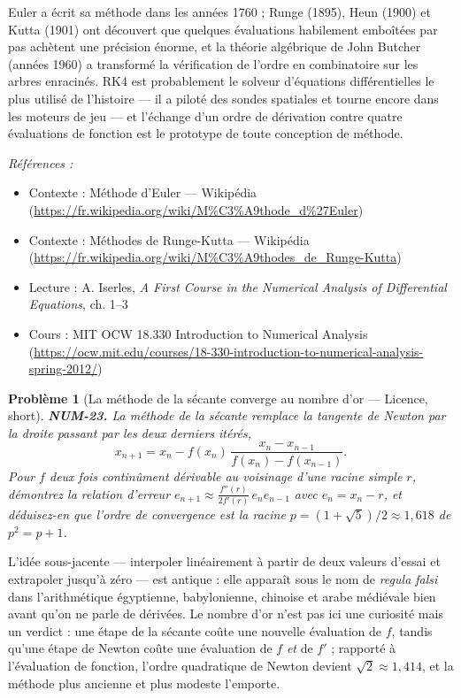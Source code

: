 \documentclass[11pt]{article}
\newtheorem{problem}{Problème}
\newenvironment{refs}{\par\small\noindent\emph{Références :}\begin{itemize}\setlength\itemsep{0pt}}{\end{itemize}\normalsize}
\begin{document}
\noindent Euler a écrit sa méthode dans les années 1760 ; Runge (1895), Heun
(1900) et Kutta (1901) ont découvert que quelques évaluations habilement emboîtées par
pas achètent une précision énorme, et la théorie algébrique de John Butcher (années
1960) a transformé la vérification de l'ordre en combinatoire sur les arbres enracinés.
RK4 est probablement le solveur d'équations différentielles le plus utilisé de
l'histoire --- il a piloté des sondes spatiales et tourne encore dans les moteurs de jeu
--- et l'échange d'un ordre de dérivation contre quatre évaluations de fonction est le
prototype de toute conception de méthode.

\begin{refs}
\item Contexte : Méthode d'Euler --- Wikipédia (\url{https://fr.wikipedia.org/wiki/M%C3%A9thode_d%27Euler})
\item Contexte : Méthodes de Runge-Kutta --- Wikipédia (\url{https://fr.wikipedia.org/wiki/M%C3%A9thodes_de_Runge-Kutta})
\item Lecture : A. Iserles, \textit{A First Course in the Numerical Analysis of Differential Equations}, ch. 1--3
\item Cours : MIT OCW 18.330 Introduction to Numerical Analysis (\url{https://ocw.mit.edu/courses/18-330-introduction-to-numerical-analysis-spring-2012/})
\end{refs}

\bigskip

\begin{problem}[{La méthode de la sécante converge au nombre d'or --- Licence, short}]
\textbf{NUM-23.} La méthode de la sécante remplace la tangente de Newton par la droite passant par les deux derniers itérés,
\[ x_{n+1} = x_n - f(x_n)\,\frac{x_n - x_{n-1}}{f(x_n) - f(x_{n-1})}. \]
Pour $f$ deux fois continûment dérivable au voisinage d'une racine simple $r$, démontrez la relation d'erreur $e_{n+1} \approx \frac{f''(r)}{2f'(r)}\, e_n e_{n-1}$ avec $e_n = x_n - r$, et déduisez-en que l'ordre de convergence est la racine $p = (1+\sqrt{5})/2 \approx 1{,}618$ de $p^2 = p + 1$.
\end{problem}

\noindent L'idée sous-jacente --- interpoler linéairement à partir de deux valeurs d'essai et extrapoler jusqu'à zéro --- est antique : elle apparaît sous le nom de \textit{regula falsi} dans l'arithmétique égyptienne, babylonienne, chinoise et arabe médiévale bien avant qu'on ne parle de dérivées. Le nombre d'or n'est pas ici une curiosité mais un verdict : une étape de la sécante coûte une nouvelle évaluation de $f$, tandis qu'une étape de Newton coûte une évaluation de $f$ \textit{et} de $f'$ ; rapporté à l'évaluation de fonction, l'ordre quadratique de Newton devient $\sqrt{2} \approx 1{,}414$, et la méthode plus ancienne et plus modeste l'emporte.
\end{document}
